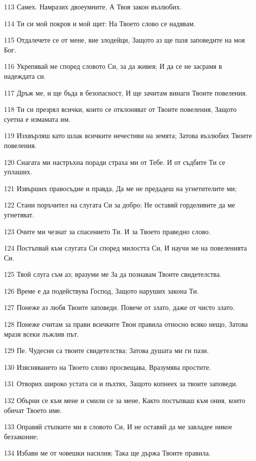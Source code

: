 \par 113 Самех. Намразих двоеумните, А Твоя закон възлюбих.
\par 114 Ти си мой покров и мой щит: На Твоето слово се надявам.
\par 115 Отдалечете се от мене, вие злодейци, Защото аз ще пазя заповедите на моя Бог.
\par 116 Укрепявай ме според словото Си, за да живея; И да се не засрамя в надеждата си.
\par 117 Дръж ме, и ще бъда в безопасност, И ще зачитам винаги Твоите повеления.
\par 118 Ти си презрял всички, които се отклоняват от Твоите повеления, Защото суетна е измамата им.
\par 119 Изхвърляш като шлак всичките нечестиви на земята; Затова възлюбих Твоите повеления.
\par 120 Снагата ми настръхна поради страха ми от Тебе. И от съдбите Ти се уплаших.
\par 121 Извърших правосъдие и правда, Да ме не предадеш на угнетителите ми;
\par 122 Стани поръчител на слугата Си за добро; Не оставяй горделивите да ме угнетяват.
\par 123 Очите ми чезнат за спасението Ти. И за Твоето праведно слово.
\par 124 Постъпвай към слугата Си според милостта Си, И научи ме на повеленията Си.
\par 125 Твой слуга съм аз; вразуми ме За да познавам Твоите свидетелства.
\par 126 Време е да подействува Господ, Защото наруших закона Ти.
\par 127 Понеже аз любя Твоите заповеди. Повече от злато, даже от чисто злато.
\par 128 Понеже считам за прави всичките Твои правила относно всяко нещо, Затова мразя всеки лъжлив път.
\par 129 Пе. Чудесни са твоите свидетелства; Затова душата ми ги пази.
\par 130 Изясняването на Твоето слово просвещава, Вразумява простите.
\par 131 Отворих широко устата си и пъхтях, Защото копнеех за твоите заповеди.
\par 132 Обърни се към мене и смили се за мене, Както постъпваш към ония, които обичат Твоето име.
\par 133 Оправяй стъпките ми в словото Си, И не оставяй да ме завладее никое беззаконие;
\par 134 Избави ме от човешки насилия; Така ще държа Твоите правила.
